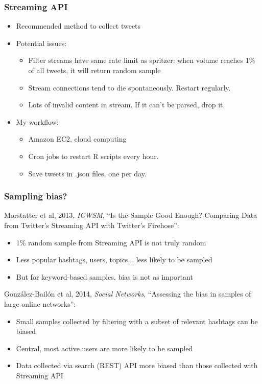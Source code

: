 \documentclass{beamer}
\begin{document}
\begin{frame}
	\frametitle{Streaming API}
	\begin{itemize}[<+->]
		\item Recommended method to collect tweets
		\item Potential issues:
		\begin{itemize}
			\item Filter streams have same rate limit as spritzer: when volume reaches 1\% of all tweets, it will return random sample
			\item Stream connections tend to die spontaneously. Restart regularly.
			\item Lots of invalid content in stream. If it can't be parsed, drop it.
		\end{itemize}
		\item My workflow:
		\begin{itemize}
			\item Amazon EC2, cloud computing
			\item Cron jobs to restart R scripts every hour.
			\item Save tweets in .json files, one per day.

		\end{itemize}
	\end{itemize}
\end{frame}


\begin{frame}
	\frametitle{Sampling bias?}
	
	\alert{Morstatter} et al, 2013, \textit{ICWSM}, ``Is the Sample Good Enough? Comparing Data from Twitter's Streaming API with Twitter's Firehose'':
	\begin{itemize}
		\item 1\% random sample from Streaming API is not truly random
		\item Less popular hashtags, users, topics... less likely to be sampled
		\item But for keyword-based samples, bias is not as important
	\end{itemize}
	\pause
	
	\alert{Gonz\'{a}lez-Bail\'{o}n} et al, 2014, \textit{Social Networks}, ``Assessing the bias in samples of large online networks'':
	\begin{itemize}
		\item Small samples collected by filtering with a subset of relevant hashtags can be biased
		\item Central, most active users are more likely to be sampled
		\item Data collected via search (REST) API more biased than those collected with Streaming API
		
	\end{itemize}
	
	
	
\end{frame}
\end{document}
